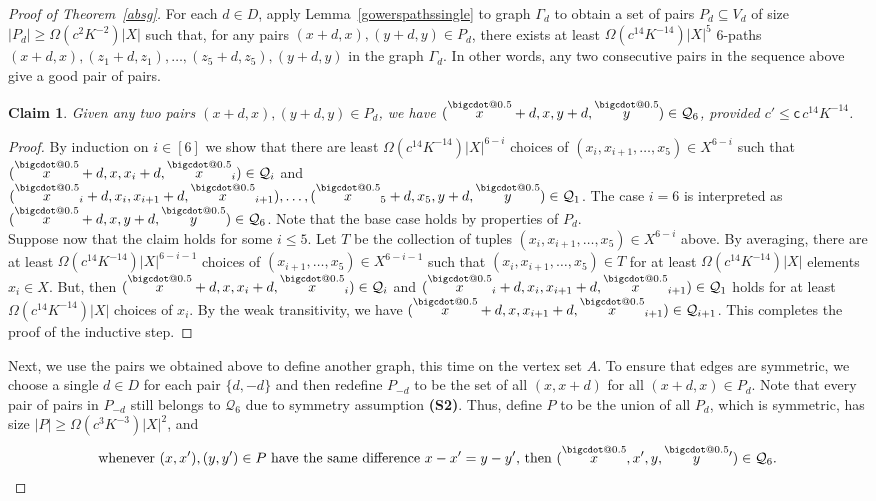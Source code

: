 \documentclass[a4paper,11pt]{article}
\makeatletter
\numberwithin{theorem}{section}
\newtheorem{claim}[theorem]{Claim}
\theoremstyle{definition}
\newcommand*\bcdot{\mathpalette\bigcdot@{0.5}}
\newcommand*\bigcdot@[2]{\mathbin{\vcenter{\hbox{\scalebox{#2}{$\m@th#1\bullet$}}}}}
\newcommand{\bsc}{\bm{\mathsf{c}}}
\newcommand{\upd}[1]{\overset{\bcdot}{#1}}
\makeatother
\begin{document}
\begin{proof}[Proof of Theorem~\ref{absg}]
    For each $d \in D$, apply Lemma~\ref{gowerspathssingle} to graph $\Gamma_d$ to obtain a set of pairs $P_d \subseteq V_d$ of size $|P_d| \geq \Omega(c^2K^{-2})|X|$ such that, for any pairs $(x + d, x), (y + d, y) \in P_d$, there exists at least $\Omega(c^{14}K^{-14})|X|^5$ 6-paths $(x + d, x), (z_1 + d, z_1), \dots, (z_5 + d, z_5), (y + d, y)$ in the graph $\Gamma_d$. In other words, any two consecutive pairs in the sequence above give a good pair of pairs. 

    \begin{claim}\label{sixtupleschainclaim}
        Given any two pairs $(x + d, x), (y + d, y) \in P_d$, we have $(\upd x + d, x, y + d, \upd y) \in \mathcal{Q}_6$, provided $c' \leq \bsc\, c^{14}K^{-14}$.
    \end{claim}

    \begin{proof}
        By induction on $i \in [6]$ we show that there are least $\Omega(c^{14}K^{-14})|X|^{6-i}$  choices of $(x_i, x_{i + 1}, \dots, x_5) \in X^{6-i}$ such that $(\upd x + d, x, x_i + d, \upd x_i) \in \mathcal{Q}_i$ and $(\upd x_i + d, x_i, x_{i + 1} + d, \upd x_{i+1}), \dots, (\upd x_5 + d, x_5, y + d, \upd y) \in \mathcal{Q}_1$. The case $i = 6$ is interpreted as $(\upd x + d, x, y + d, \upd y) \in \mathcal{Q}_6$. Note that the base case holds by properties of $P_d$.\\

        Suppose now that the claim holds for some $i \leq 5$. Let $T$ be the collection of tuples $(x_i, x_{i + 1}, \dots, x_5) \in X^{6-i}$ above. By averaging, there are at least $\Omega(c^{14}K^{-14})|X|^{6-i - 1}$ choices of $(x_{i + 1}, \dots, x_5) \in X^{6-i - 1}$ such that $(x_i, x_{i + 1}, \dots, x_5) \in T$ for at least $\Omega(c^{14}K^{-14})|X|$ elements $x_i \in X$. But, then $(\upd x + d, x, x_i + d, \upd x_i) \in \mathcal{Q}_i$ and $(\upd x_i + d, x_i, x_{i + 1} + d, \upd x_{i+1}) \in \mathcal{Q}_1$ holds for at least $\Omega(c^{14}K^{-14})|X|$ choices of $x_i$. By the weak transitivity, we have $(\upd x + d, x, x_{i + 1} + d, \upd x_{i + 1}) \in \mathcal{Q}_{i + 1}$. This completes the proof of the inductive step.
    \end{proof}

    Next, we use the pairs we obtained above to define another graph, this time on the vertex set $A$. To ensure that edges are symmetric, we choose a single $d \in D$ for each pair $\{d, -d\}$ and then redefine $P_{-d}$ to be the set of all $(x, x + d)$ for all $(x + d, x) \in P_d$. Note that every pair of pairs in $P_{-d}$ still belongs to $\mathcal{Q}_6$ due to symmetry assumption \textbf{(S2)}. Thus, define $P$ to be the union of all $P_d$, which is symmetric, has size $|P| \geq \Omega(c^3K^{-3})|X|^2$, and 
    \begin{equation} \text{whenever }(x, x'), (y, y') \in P\text{ have the same difference }x - x' = y - y'\text{, then }(\upd x, x', y, \upd{y} {}') \in \mathcal{Q}_6.\label{ppairsproperty}\end{equation}


\end{proof}
\end{document}
